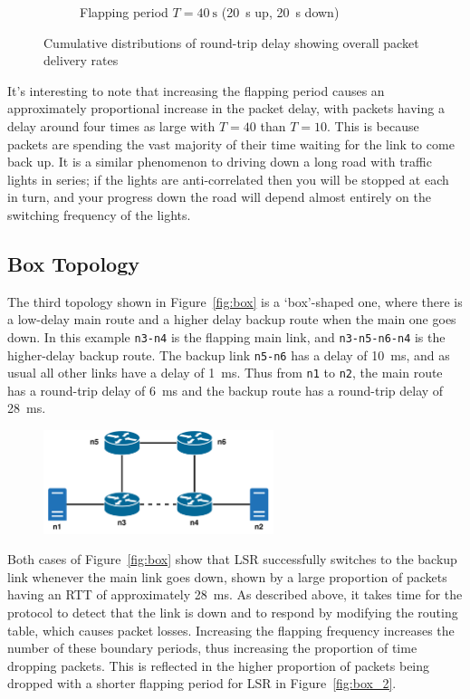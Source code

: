 \documentclass[withindex,glossary,openany]{cam-thesis}
\begin{document}
\begin{figure}[H]
\begin{subfigure}{.5\textwidth}
  \caption{Flapping period $T=\SI{40}{\s}$ (\SI{20}{\s} up, \SI{20}{\s} down)}
  \label{fig:full_partition_flap20}
\end{subfigure}
\caption{Cumulative distributions of round-trip delay showing overall packet delivery rates}
\label{fig:full_partition_flap}
\end{figure}

It's interesting to note that increasing the flapping period causes an approximately proportional increase in the packet delay, with packets having a delay around four times as large with $T=40$ than $T=10$. This is because packets are spending the vast majority of their time waiting for the link to come back up. It is a similar phenomenon to driving down a long road with traffic lights in series; if the lights are anti-correlated then you will be stopped at each in turn, and your progress down the road will depend almost entirely on the switching frequency of the lights.


\subsection{Box Topology}

The third topology shown in Figure~\ref{fig:box} is a `box'-shaped one, where there is a low-delay main route and a higher delay backup route when the main one goes down. In this example \texttt{n3-n4} is the flapping main link, and \texttt{n3-n5-n6-n4} is the higher-delay backup route. The backup link \texttt{n5-n6} has a delay of \SI{10}{\ms}, and as usual all other links have a delay of \SI{1}{\ms}. Thus from \texttt{n1} to \texttt{n2}, the main route has a round-trip delay of \SI{6}{\ms} and the backup route has a round-trip delay of \SI{28}{\ms}.

\begin{figure}[h]
\centering
	\includegraphics[width=0.6\textwidth]{delay_box_topology}
\end{figure}

Both cases of Figure~\ref{fig:box} show that LSR successfully switches to the backup link whenever the main link goes down, shown by a large proportion of packets having an RTT of approximately \SI{28}{\ms}. As described above, it takes time for the protocol to detect that the link is down and to respond by modifying the routing table, which causes packet losses. Increasing the flapping frequency increases the number of these boundary periods, thus increasing the proportion of time dropping packets. This is reflected in the higher proportion of packets being dropped with a shorter flapping period for LSR in Figure~\ref{fig:box_2}.
\end{document}
